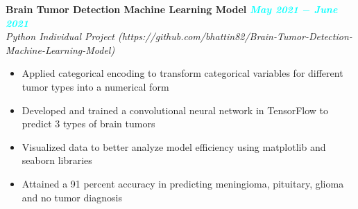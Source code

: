 \documentclass{article}
\begin{document}
\textbf{Brain Tumor Detection Machine Learning Model} \hfill \textit{\textcolor{cyan}{\textbf{May 2021 $-$ June 2021}}} \\
\textit{Python Individual Project (https://github.com/bhattin82/Brain-Tumor-Detection-Machine-Learning-Model)}
\begin{itemize}[noitemsep, nolistsep]
    \item Applied categorical encoding to transform categorical variables for different tumor types into a numerical form
    \item Developed and trained a convolutional neural network in TensorFlow to predict 3 types of brain tumors
    \item Visualized data to better analyze model efficiency using matplotlib and seaborn libraries
    \item Attained a 91 percent accuracy in predicting meningioma, pituitary, glioma and no tumor diagnosis \\
\end{itemize}
\end{document}
